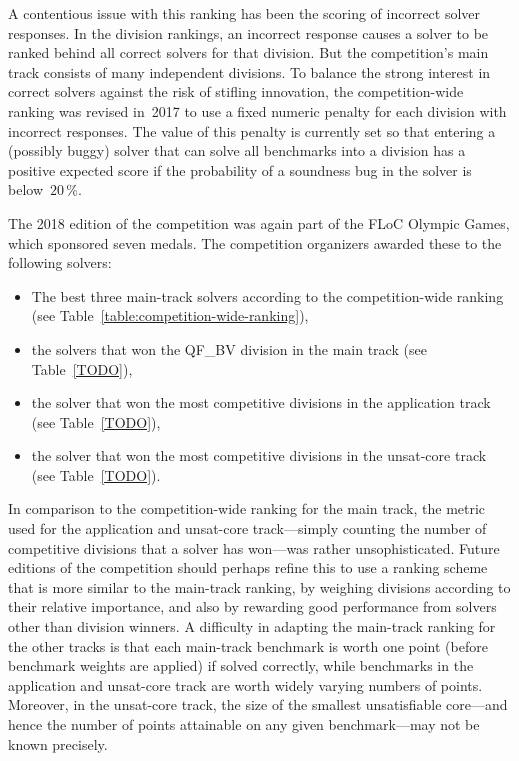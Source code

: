 \documentclass[twoside,11pt]{article}
\begin{document}
A contentious issue with this ranking has been the scoring of
incorrect solver responses.  In the division rankings, an incorrect
response causes a solver to be ranked behind all correct solvers for
that division.  But the competition's main track consists of many
independent divisions.  To balance the strong interest in correct
solvers against the risk of stifling innovation, the competition-wide
ranking was revised in~2017 to use a fixed numeric penalty for each
division with incorrect responses.  The value of this penalty is
currently set so that entering a (possibly buggy) solver that can
solve all benchmarks into a division has a positive expected score if
the probability of a soundness bug in the solver is
below~$20\,\%$.~\cite{rules18}

The 2018 edition of the competition was again part of the FLoC Olympic
Games, which sponsored seven medals.  The competition organizers
awarded these to the following solvers:
\begin{itemize}
\item The best three main-track solvers according to the
  competition-wide ranking (see
  Table~\ref{table:competition-wide-ranking}),
\item the solvers that won the QF\_BV division in the main track (see
  Table~\ref{TODO}),
\item the solver that won the most competitive divisions in the
  application track (see Table~\ref{TODO}),
\item the solver that won the most competitive divisions in the
  unsat-core track (see Table~\ref{TODO}).
\end{itemize}


In comparison to the competition-wide ranking for the main track, the
metric used for the application and unsat-core track---simply counting
the number of competitive divisions that a solver has won---was rather
unsophisticated.  Future editions of the competition should perhaps
refine this to use a ranking scheme that is more similar to the
main-track ranking, by weighing divisions according to their relative
importance, and also by rewarding good performance from solvers other
than division winners.  A difficulty in adapting the main-track
ranking for the other tracks is that each main-track benchmark is
worth one point (before benchmark weights are applied) if solved
correctly, while benchmarks in the application and unsat-core track
are worth widely varying numbers of points.  Moreover, in the
unsat-core track, the size of the smallest unsatisfiable core---and
hence the number of points attainable on any given benchmark---may not
be known precisely.
\end{document}
